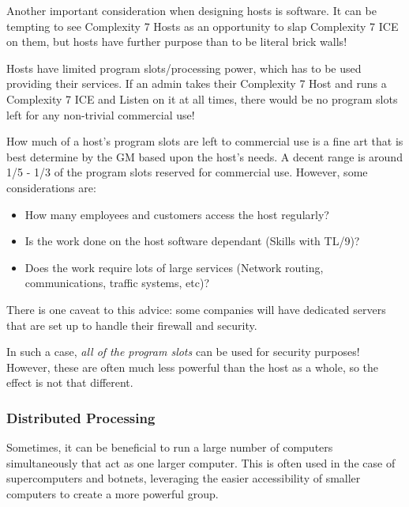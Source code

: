 \begin{multicols*}{3}
	Another important consideration when designing hosts is software. It can be tempting to see Complexity 7 Hosts as an opportunity to slap Complexity 7 ICE on them, but hosts have further purpose than to be literal brick walls!
	
	Hosts have limited program slots/processing power, which has to be used providing their services. If an admin takes their Complexity 7 Host and runs a Complexity 7 ICE and Listen on it at all times, there would be no program slots left for any non-trivial commercial use!
	
	How much of a host's program slots are left to commercial use is a fine art that is best determine by the GM based upon the host's needs. A decent range is around 1/5 - 1/3 of the program slots reserved for commercial use. However, some considerations are: 
	
	\begin{itemize}
		\itemsep 0pt
		\item How many employees and customers access the host regularly? 
		\item Is the work done on the host software dependant (Skills with TL/9)?
		\item Does the work require lots of large services (Network routing, communications, traffic systems, etc)?
	\end{itemize}
	
	There is one caveat to this advice: some companies will have dedicated servers that are set up to handle their firewall and security. 
	
	In such a case, \textit{all of the program slots} can be used for security purposes! However, these are often much less powerful than the host as a whole, so the effect is not that different.
	
	\begin{wrapfigure}[17]{l}{70pt}
		
	\end{wrapfigure}
	
	\subsubsection{Distributed Processing}
	
	Sometimes, it can be beneficial to run a large number of computers simultaneously that act as one larger computer. This is often used in the case of supercomputers and botnets, leveraging the easier accessibility of smaller computers to create a more powerful group.
	

\end{multicols*}
